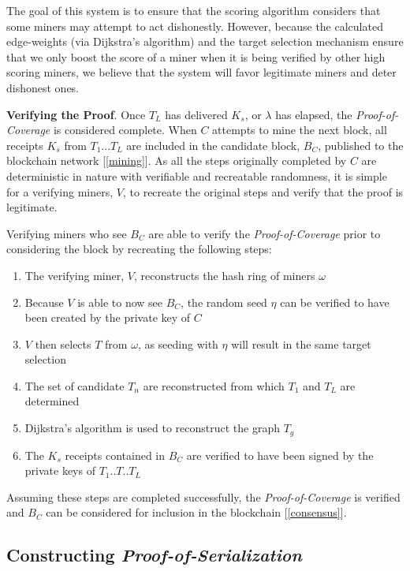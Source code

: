 \documentclass[UTF8, 10pt, nonatbib, nocopyrightspace, reprint]{sigplanconf}
\newcommand{\secref}[1]{[\autoref{#1}]}
\begin{document}
The goal of this system is to ensure that the scoring algorithm considers that some miners may attempt to act dishonestly. However, because the calculated edge-weights (via Dijkstra's algorithm) and the target selection mechanism ensure that we only boost the score of a miner when it is being verified by other high scoring miners, we believe that the system will favor legitimate miners and deter dishonest ones.

\textbf{Verifying the Proof}. Once $T_L$ has delivered $K_s$, or $\lambda$ has elapsed, the \emph{Proof-of-Coverage} is considered complete. When $C$ attempts to mine the next block, all receipts $K_s$ from $T_1$...$T_L$ are included in the candidate block, $B_C$, published to the blockchain network \secref{mining}. As all the steps originally completed by $C$ are deterministic in nature with verifiable and recreatable randomness, it is simple for a verifying miners, $V$, to recreate the original steps and verify that the proof is legitimate.

Verifying miners who see $B_C$ are able to verify the \emph{Proof-of-Coverage} prior to considering the block by recreating the following steps:

\begin{enumerate}
        \item The verifying miner, $V$, reconstructs the hash ring of miners $\omega$
        \item Because $V$ is able to now see $B_C$, the random seed $\eta$ can be verified to have been created by the private key of $C$
        \item $V$ then selects $T$ from $\omega$, as seeding with $\eta$ will result in the same target selection
        \item The set of candidate $T_n$ are reconstructed from which $T_1$ and $T_L$ are determined
        \item Dijkstra's algorithm is used to reconstruct the graph $T_g$
        \item The $K_s$ receipts contained in $B_C$ are verified to have been signed by the private keys of $T_1$..$T$..$T_L$
\end{enumerate}

Assuming these steps are completed successfully, the \emph{Proof-of-Coverage} is verified and $B_C$ can be considered for inclusion in the blockchain \secref{consensus}.

\subsection{Constructing \emph{Proof-of-Serialization}}
\end{document}
